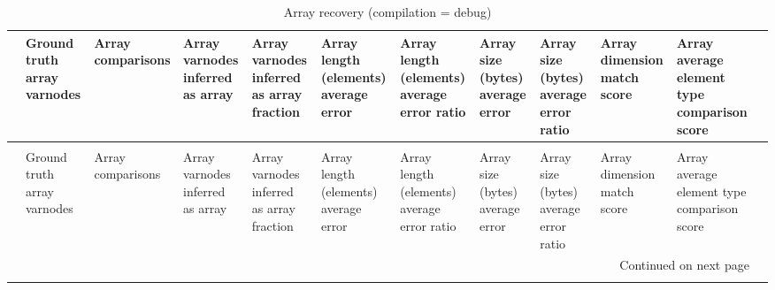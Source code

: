 \begin{longtable}{lp{1.00cm}p{1.00cm}p{1.00cm}p{1.00cm}p{1.00cm}p{1.00cm}p{1.00cm}p{1.00cm}p{1.00cm}p{1.00cm}p{1.00cm}}
\caption{Array recovery (compilation = debug)}
\label{table:array-comparisons-O0-debug}\\
\toprule
{} &  Ground truth array varnodes &  Array comparisons &  Array varnodes inferred as array &  Array varnodes inferred as array fraction &  Array length (elements) average error &  Array length (elements) average error ratio &  Array size (bytes) average error &  Array size (bytes) average error ratio &  Array dimension match score &  Array average element type comparison score \\
\midrule
\endfirsthead
\caption[]{Array recovery (compilation = debug)} \\
\toprule
{} &  Ground truth array varnodes &  Array comparisons &  Array varnodes inferred as array &  Array varnodes inferred as array fraction &  Array length (elements) average error &  Array length (elements) average error ratio &  Array size (bytes) average error &  Array size (bytes) average error ratio &  Array dimension match score &  Array average element type comparison score \\
\midrule
\endhead
\midrule
\multicolumn{11}{r}{{Continued on next page}} \\
\midrule
\endfoot


\end{longtable}
